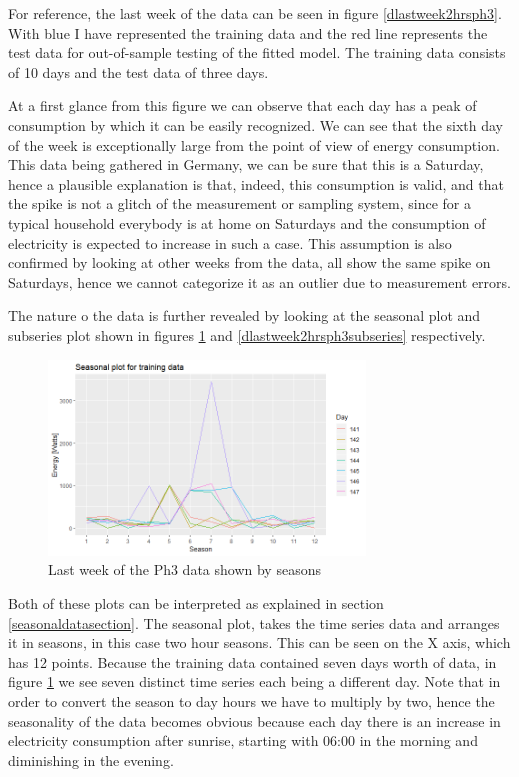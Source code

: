 \documentclass[12pt,a4paper,titlepage]{report}
\begin{document}
For reference, the last week of the data can be seen in figure \ref{dlastweek2hrsph3}.
With blue I have represented the training data and the red line represents the test data for out-of-sample testing of the fitted model. The training data consists of 10 days and the test data of three days.

At a first glance from this figure we can observe that each day has a peak of consumption by which it can be easily recognized. We can see that the sixth day of the week is exceptionally large from the point of view of energy consumption. This data being gathered in Germany, we can be sure that this is a Saturday, hence a plausible explanation is that, indeed, this consumption is valid, and that the spike is not a glitch of the measurement or sampling system, since for a typical household everybody is at home on Saturdays and the consumption of electricity is expected to increase in such a case. This assumption is also confirmed by looking at other weeks from the data, all show the same spike on Saturdays, hence we cannot categorize it as an outlier due to measurement errors.

The nature o the data is further revealed by looking at the seasonal plot and subseries plot shown in figures \ref{dlastweek2hrsph3seasonal} and \ref{dlastweek2hrsph3subseries} respectively.

\begin{figure}[h]
    \centering
    \includegraphics[width=0.75\textwidth]{dlastweek2hrsph3seasonal}
    \caption{Last week of the Ph3 data shown by seasons}
    \label{dlastweek2hrsph3seasonal}
\end{figure}

Both of these plots can be interpreted as explained in section \ref{seasonaldatasection}.
The seasonal plot, takes the time series data and arranges it in seasons, in this case two hour seasons. This can be seen on the X axis, which has 12 points. Because the training data contained seven days worth of data, in figure \ref{dlastweek2hrsph3seasonal} we see seven distinct time series each being a different day. Note that in order to convert the season to day hours we have to multiply by two, hence the seasonality of the data becomes obvious because each day there is an increase in electricity consumption after sunrise, starting with 06:00 in the morning and diminishing in the evening.
\end{document}
